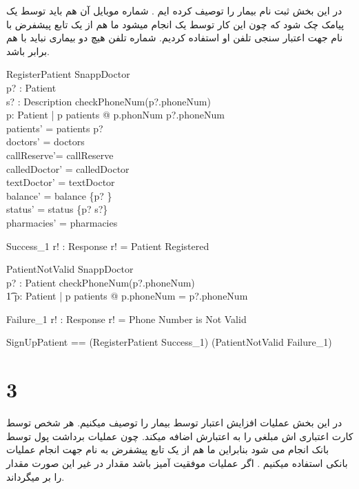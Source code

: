 \documentclass{article}
\begin{document}
در این بخش ثبت نام بیمار را توصیف کرده ایم . شماره موبایل آن هم باید توسط یک پیامک چک شود که چون این کار توسط یک  انجام میشود ما هم از یک تابع پیشفرض با نام  جهت اعتبار سنجی تلفن او استفاده کردیم. شماره تلفن هیچ دو بیماری نباید با هم برابر باشد.
\begin{schema}{RegisterPatient}
\Delta SnappDoctor\\
p? : Patient\\
s? : Description
\where
checkPhoneNum(p?.phoneNum)\\
\forall p: Patient | p \in patients @ p.phonNum \neq p?.phoneNum\\
patients' = patients \cup p?\\
doctors' = doctors\\ 
callReserve'= callReserve\\
calledDoctor' = calledDoctor\\
textDoctor' = textDoctor\\
balance' = balance \cup \{p? \}\\
status' = status \cup \{p? \mapsto s?\}\\
pharmacies' = pharmacies 
\end{schema}

\begin{schema}{Success_1}
r! : Response
\where
r! = Patient Registered
\end{schema}

\begin{schema}{PatientNotValid}
\Xi SnappDoctor\\
p? : Patient
\where
\neg checkPhoneNum(p?.phoneNum) \lor\\ 
\t1 \exists p: Patient | p \in patients @ p.phoneNum = p?.phoneNum
\end{schema}

\begin{schema}{Failure_1}
r! : Response
\where
r! = Phone Number is Not Valid
\end{schema}

\begin{zed}
SignUpPatient == (RegisterPatient \land Success_1) \lor (PatientNotValid \land Failure_1)
\end{zed}

\section*{3}

در این بخش عملیات افزایش اعتبار توسط بیمار را توصیف میکنیم. هر شخص توسط کارت اعتباری اش مبلغی را به اعتبارش اضافه میکند. چون عملیات برداشت پول توسط بانک انجام می شود بنابراین ما هم از یک تابع پیشفرض به نام   جهت انجام عملیات بانکی استفاده میکنیم . اگر عملیات موفقیت آمیز باشد مقدار   در غیر این صورت مقدار   را بر میگرداند.
\end{document}

